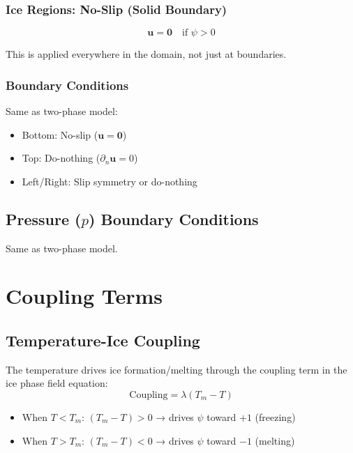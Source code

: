 \documentclass[12pt]{article}
\begin{document}
\subsubsection{Ice Regions: No-Slip (Solid Boundary)}

\begin{equation}
\mathbf{u} = \mathbf{0} \quad \text{if } \psi > 0
\label{eq:velocity_ice}
\end{equation}

This is applied everywhere in the domain, not just at boundaries.

\subsubsection{Boundary Conditions}

Same as two-phase model:
\begin{itemize}
    \item Bottom: No-slip ($\mathbf{u} = \mathbf{0}$)
    \item Top: Do-nothing ($\partial_n \mathbf{u} = 0$)
    \item Left/Right: Slip symmetry or do-nothing
\end{itemize}

\subsection{Pressure ($p$) Boundary Conditions}

Same as two-phase model.

\section{Coupling Terms}

\subsection{Temperature-Ice Coupling}

The temperature drives ice formation/melting through the coupling term in the ice phase field equation:
\begin{equation}
\text{Coupling} = \lambda (T_m - T)
\label{eq:temperature_coupling}
\end{equation}

\begin{itemize}
    \item When $T < T_m$: $(T_m - T) > 0$ → drives $\psi$ toward $+1$ (freezing)
    \item When $T > T_m$: $(T_m - T) < 0$ → drives $\psi$ toward $-1$ (melting)
\end{itemize}
\end{document}
